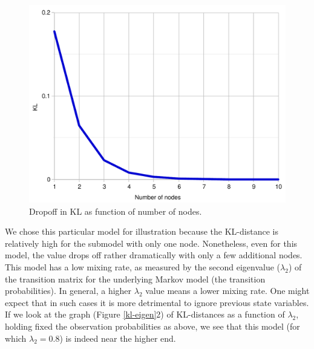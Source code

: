 \documentclass[10pt,letterpaper]{article}
\begin{document}
 \begin{figure}[h]  \begin{center}
\includegraphics[scale=0.3]{hmm1.pdf} \caption{Dropoff in KL as function of number of nodes.} \end{center} 
\label{hmm}\end{figure} 
We chose this particular model for illustration because the KL-distance is relatively high for the submodel with only one node. Nonetheless, even for this model, the value drops off rather dramatically with only a few additional nodes. This model has a low mixing rate, as measured by the second eigenvalue ($\lambda_2$) of the transition matrix for the underlying Markov model (the transition probabilities). In general, a higher $\lambda_2$ value means a lower mixing rate. One might expect that in such cases it is more detrimental to ignore previous state variables. If we look at the graph (Figure \ref{kl-eigen}2) of KL-distances as a function of $\lambda_2$, holding fixed the observation probabilities as above, we see that this model (for which $\lambda_2 = 0.8$) is indeed near the higher end.
\end{document}
